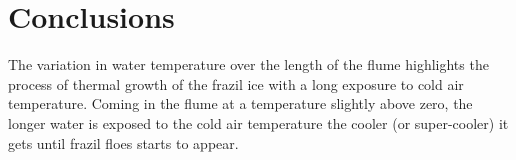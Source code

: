 \section{Conclusions}

The variation in water temperature over the length of the flume highlights the process of thermal growth of the frazil ice with a long exposure to cold air temperature. Coming in the flume at a temperature slightly above zero, the longer water is exposed to the cold air temperature the cooler (or super-cooler) it gets until frazil floes starts to appear.

%
%
%
%
%
%


\renewcommand{\labelitemi}{\textbullet}
